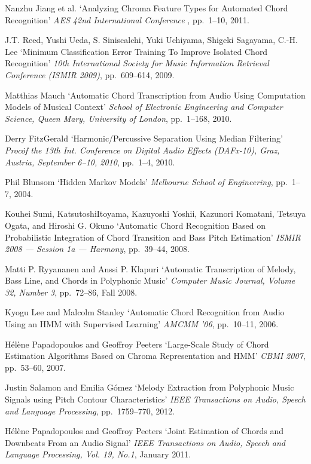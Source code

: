 \documentclass{article}
\begin{document}
\begin{thebibliography}{citations}
Nanzhu Jiang et al.
`Analyzing Chroma Feature Types for Automated Chord Recognition'
{\it AES 42nd International Conference },
pp.~1--10, 2011.

J.T. Reed, Yushi Ueda, S. Siniscalchi, Yuki Uchiyama, Shigeki Sagayama, C.-H. Lee
`Minimum Classification Error Training To Improve Isolated Chord Recognition'
{\it 10th International Society for Music Information Retrieval Conference (ISMIR 2009)},
pp.~609--614, 2009.

Matthias Mauch
`Automatic Chord Transcription from Audio Using Computation Models of Musical Context'
{\it School of Electronic Engineering and Computer Science, Queen Mary, University of London},
pp.~1--168, 2010.

Derry FitzGerald
`Harmonic/Percussive Separation Using Median Filtering'
{\it Proc\. of the 13th Int. Conference on Digital Audio Effects (DAFx-10), Graz, Austria, September 6--10, 2010},
pp.~1--4, 2010.

Phil Blunsom
`Hidden Markov Models'
{\it Melbourne School of Engineering},
pp.~1--7, 2004.

Kouhei Sumi, KatsutoshiItoyama, Kazuyoshi Yoshii, Kazunori Komatani, Tetsuya Ogata, and Hiroshi G. Okuno
`Automatic Chord Recognition Based on Probabilistic Integration of Chord Transition and Bass Pitch Estimation'
{\it ISMIR 2008 --- Session 1a --- Harmony},
pp.~39--44, 2008.

Matti P. Ryyananen and Anssi P. Klapuri
`Automatic Transcription of Melody, Bass Line, and Chords in Polyphonic Music'
{\it Computer Music Journal, Volume 32, Number 3},
pp.~72--86, Fall 2008.

Kyogu Lee and Malcolm Stanley
`Automatic Chord Recognition from Audio Using an HMM with Supervised Learning'
{\it AMCMM '06},
pp.~10--11, 2006.

Hélène Papadopoulos and Geoffroy Peeters
`Large-Scale Study of Chord Estimation Algorithms Based on Chroma Representation and HMM'
{\it CBMI 2007},
pp.~53--60, 2007.

Justin Salamon and Emilia G{\'o}mez
`Melody Extraction from Polyphonic Music Signals using Pitch Contour Characteristics'
{\it IEEE Transactions on Audio, Speech and Language Processing},
pp.~1759--770, 2012.

Hélène Papadopoulos and Geoffroy Peeters
`Joint Estimation of Chords and Downbeats From an Audio Signal'
{\it IEEE Transactions on Audio, Speech and Language Processing, Vol. 19, No.1},
January 2011.


\end{thebibliography}
\end{document}
